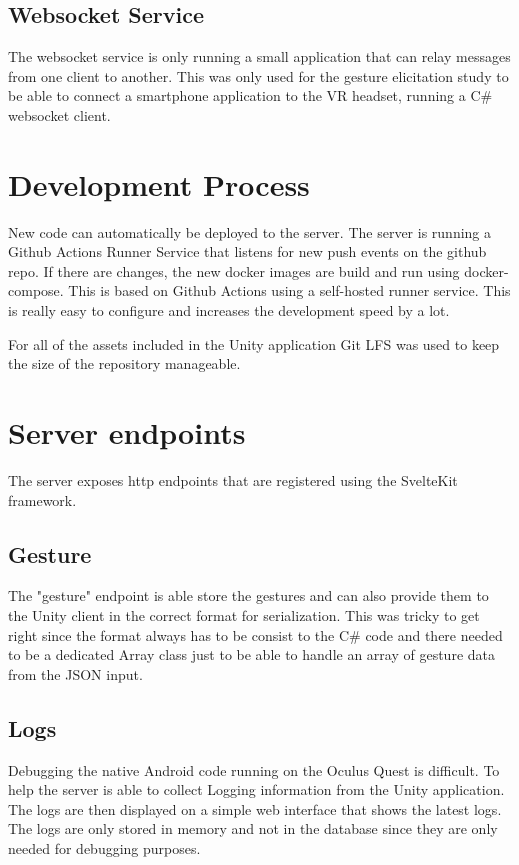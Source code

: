 \subsection{Websocket Service}
The websocket service is only running a small application that can relay messages from one client to another. This was only used for the gesture elicitation study to be able to connect a smartphone application to the VR headset, running a C\# websocket client.


\section{Development Process}
New code can automatically be deployed to the server. The server is running a Github Actions Runner Service that listens for new push events on the github repo. If there are changes, the new docker images are build and run using docker-compose. This is based on Github Actions using a self-hosted runner service. This is really easy to configure and increases the development speed by a lot. 

For all of the assets included in the Unity application Git LFS was used to keep the size of the repository manageable.


\section{Server endpoints}
The server exposes http endpoints that are registered using the SvelteKit framework.

\subsection{Gesture}
The "gesture" endpoint is able store the gestures and can also provide them to the Unity client in the correct format for serialization. This was tricky to get right since the format always has to be consist to the C\# code and there needed to be a dedicated Array class just to be able to handle an array of gesture data from the JSON input.

\subsection{Logs}
Debugging the native Android code running on the Oculus Quest is difficult. To help the server is able to collect Logging information from the Unity application. The logs are then displayed on a simple web interface that shows the latest logs. The logs are only stored in memory and not in the database since they are only needed for debugging purposes. 


